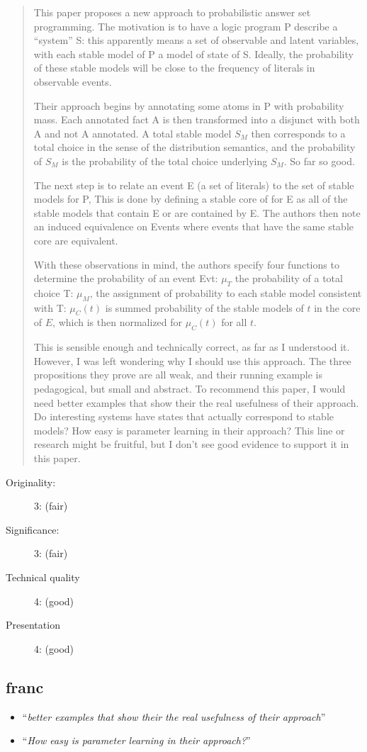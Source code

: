\documentclass{tlp}
\begin{document}
\begin{quotation}
  This paper proposes a new approach to probabilistic answer set programming. The motivation is to have a logic program P describe a ``system'' S: this apparently means a set of observable and latent variables, with each stable model of P a model of state of S. Ideally, the probability of these stable models will be close to the frequency of literals in observable events.

Their approach begins by annotating some atoms in P with probability mass. Each annotated fact A is then transformed into a disjunct with both A and not A annotated. A total stable model $S_M$ then corresponds to a total choice in the sense of the distribution semantics, and the probability of $S_M$ is the probability of the total choice underlying $S_M$. So far so good.


The next step is to relate an event E (a set of literals) to the set of stable models for P, This is done by defining a stable core of for E as all of the stable models that contain E or are contained by E. The authors then note an induced equivalence on Events where events that have the same stable core are equivalent.

With these observations in mind, the authors specify four functions to determine the probability of an event Evt: $\mu_T$ the probability of a total choice T: $\mu_M$, the assignment of probability to each stable model consistent with T: $\mu_C(t)$ is summed probability of the stable models of $t$ in the core of $E$, which is then normalized for $\mu_C(t)$ for all $t$.

This is sensible enough and technically correct, as far as I understood it. However, I was left wondering why I should use this approach. The three propositions they prove are all weak, and their running example is pedagogical, but small and abstract. To recommend this paper, I would need better examples that show their the real usefulness of their approach. Do interesting systems have states that actually correspond to stable models? How easy is parameter learning in their approach? This line or research might be fruitful, but I don't see good evidence to support it in this paper.
  
\end{quotation}

\begin{description}
  \item[Originality:] 3: (fair)
  \item[Significance:]  3: (fair)
  \item[Technical quality] 4: (good)
  \item[Presentation] 4: (good)
\end{description}

\subsection*{franc}

\begin{itemize}
  \item ``\textit{better examples that show their the real usefulness of their approach}''
  \item ``\textit{How easy is parameter learning in their approach?}''
\end{itemize}
\end{document}
